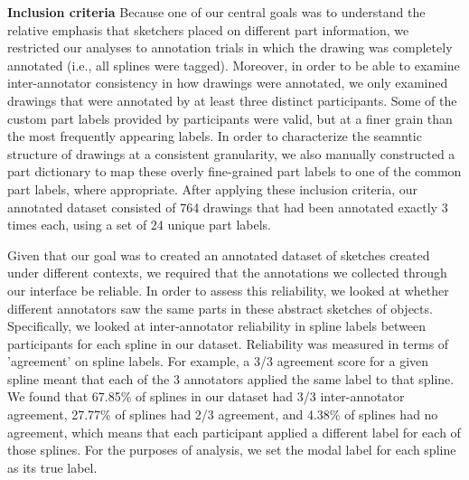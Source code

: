 \documentclass[10pt,letterpaper]{article}
\newcommand{\jefan}[1]{{\color{blue}{[jefan: #1]}}}
\begin{document}
\noindent \textbf{Inclusion criteria} \hspace{3mm} Because one of our central goals was to understand the relative emphasis that sketchers placed on different part information, we restricted our analyses to annotation trials in which the drawing was completely annotated (i.e., all splines were tagged). 
Moreover, in order to be able to examine inter-annotator consistency in how drawings were annotated, we only examined drawings that were annotated by at least three distinct participants. 
\jefan{By the way, are we including drawings that were annotated more than three times? We could, of course, and just ignore the 4th and onward... Also, have we ever checked whether the annotations were coming from distinct participants? Not sure, this requires comparing workerId, which we do not save to the group dataframe.}
Some of the custom part labels provided by participants were valid, but at a finer grain than the most frequently appearing labels. \jefan{Perhaps include an example of one of these.} 
In order to characterize the seamntic structure of drawings at a consistent granularity, we also manually constructed a part dictionary to map these overly fine-grained part labels to one of the common part labels, where appropriate. 
After applying these inclusion criteria, our annotated dataset consisted of 764 drawings that had been annotated exactly 3 times each, using a set of 24 unique part labels. 


Given that our goal was to created an annotated dataset of sketches created under different contexts, we required that the annotations we collected through our interface be reliable. 
In order to assess this reliability, we looked at whether different annotators saw the same parts in these abstract sketches of objects. 
Specifically, we looked at inter-annotator reliability in spline labels between participants for each spline in our dataset. 
Reliability was measured in terms of 'agreement' on spline labels. 
For example, a 3/3 agreement score for a given spline meant that each of the 3 annotators applied the same label to that spline. 
We found that 67.85\% of splines in our dataset had 3/3 inter-annotator agreement, 27.77\% of splines had 2/3 agreement, and 4.38\% of splines had no agreement, which means that each participant applied a different label for each of those splines.
For the purposes of analysis, we set the modal label for each spline as its true label.
\end{document}
